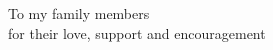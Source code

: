 
\vspace*{1cm}

\begin{dedication} %


\begin{center}
\Large

\vspace*{1cm}

To  my family members\\
for their love, support and encouragement \\

%





\end{center}
\vspace{0.5cm}


\end{dedication}
